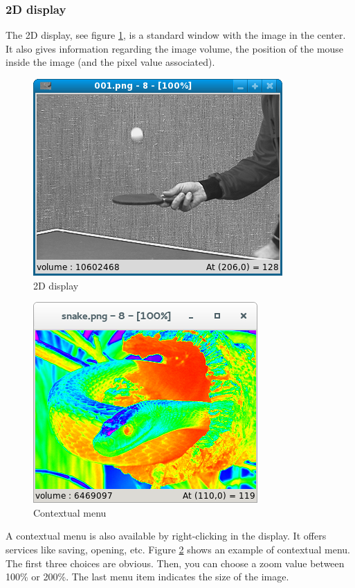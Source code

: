 \documentclass[a4paper,10pt,oneside]{article}
\begin{document}
\subsubsection{2D display}

The 2D display, see figure \ref{fig:dis2D}, is a standard window with the image
in the center. It also gives information regarding the image volume, the position of
the mouse inside the image (and the pixel value associated).

\begin{figure}
\centering
\includegraphics[scale=0.5]{images/mamba_win.png}
\caption{2D display}
\label{fig:dis2D}
\end{figure}


\begin{figure}
\centering
\includegraphics[scale=0.5]{images/mamba_menu.png}
\caption{Contextual menu}
\label{fig:dis2D_menu}
\end{figure}

A contextual menu is also available by right-clicking in the display. It offers
services like saving, opening, etc. Figure \ref{fig:dis2D_menu} shows an example of 
contextual menu. The first three choices are obvious. Then, you can choose a zoom
value between 100\% or 200\%. The last menu item indicates the size of
the image.
\end{document}
